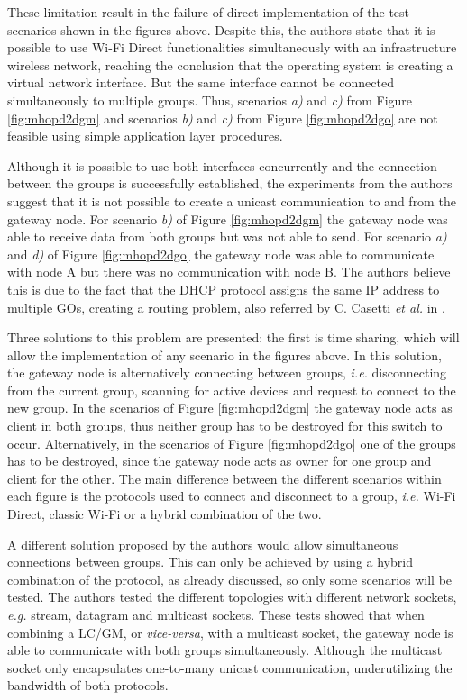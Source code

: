 These limitation result in the failure of direct implementation of the test scenarios shown in the figures above. Despite this, the authors state that it is possible to use Wi-Fi Direct functionalities simultaneously with an infrastructure wireless network, reaching the conclusion that the operating system is creating a virtual network interface. But the same interface cannot be connected simultaneously to multiple groups. Thus, scenarios \textit{a)} and \textit{c)} from Figure \ref{fig:mhopd2dgm} and scenarios \textit{b)} and \textit{c)} from Figure \ref{fig:mhopd2dgo} are not feasible using simple application layer procedures.

Although it is possible to use both interfaces concurrently and the connection between the groups is successfully established, the experiments from the authors suggest that it is not possible to create a unicast communication to and from the gateway node. For scenario \textit{b)} of Figure \ref{fig:mhopd2dgm} the gateway node was able to receive data from both groups but was not able to send. For scenario \textit{a)} and \textit{d)} of Figure \ref{fig:mhopd2dgo} the gateway node was able to communicate with node A but there was no communication with node B. The authors believe this is due to the fact that the \gls{DHCP} protocol assigns the same \gls{IP} address to multiple \glspl{GO}, creating a routing problem, also referred by C. Casetti \textit{et al.} in \cite{routeMultiGroup}.

Three solutions to this problem are presented: the first is time sharing, which will allow the implementation of any scenario in the figures above. In this solution, the gateway node is alternatively connecting between groups, \textit{i.e.} disconnecting from the current group, scanning for active devices and request to connect to the new group. In the scenarios of Figure \ref{fig:mhopd2dgm} the gateway node acts as client in both groups, thus neither group has to be destroyed for this switch to occur. Alternatively, in the scenarios of Figure \ref{fig:mhopd2dgo} one of the groups has to be destroyed, since the gateway node acts as owner for one group and client for the other. The main difference between the different scenarios within each figure is the protocols used to connect and disconnect to a group, \textit{i.e.} Wi-Fi Direct, classic Wi-Fi or a hybrid combination of the two.

A different solution proposed by the authors would allow simultaneous connections between groups. This can only be achieved by using a hybrid combination of the protocol, as already discussed, so only some scenarios will be tested. The authors tested the different topologies with different network sockets, \textit{e.g.} stream, datagram and multicast sockets. These tests showed that when combining a LC/GM, or \textit{vice-versa}, with a multicast socket, the gateway node is able to communicate with both groups simultaneously. Although the multicast socket only encapsulates one-to-many unicast communication, underutilizing the bandwidth of both protocols.

